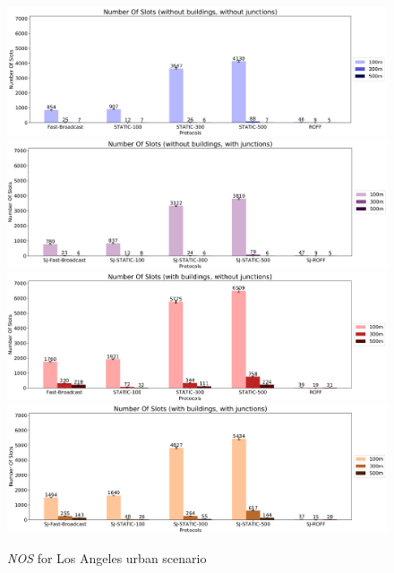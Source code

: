 		\begin{figure}[H]
			\centering
			\includegraphics[width=1.0\textwidth]{immagini/la-25/b0/j0/nos}
			\includegraphics[width=1.0\textwidth]{immagini/la-25/b0/j1/nos}
			\includegraphics[width=1.0\textwidth]{immagini/la-25/b1/j0/nos}
			\includegraphics[width=1.0\textwidth]{immagini/la-25/b1/j1/nos}
			\caption{\textit{NOS} for Los Angeles urban scenario}
			\label{fig:la-25-nos}
		\end{figure}

